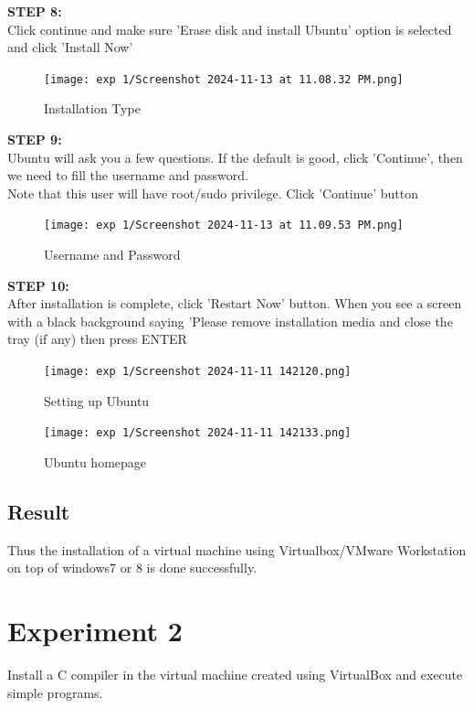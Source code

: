 \documentclass[12pt]{article}
\begin{document}
\begin{spacing}{1.5}
\begin{adjustwidth}{0cm}{0cm}
\begin{justify}
\textbf{STEP 8:} \\
Click continue and make sure 'Erase disk and install Ubuntu' option is selected and click 'Install Now'

\begin{figure}[H]
    \centering
    \texttt{[image: exp 1/Screenshot 2024-11-13 at 11.08.32 PM.png]}
    \caption{Installation Type}
    \label{fig: 1}
\end{figure}

\textbf{STEP 9:} \\
Ubuntu will ask you a few questions. If the default is good, click 'Continue', then we need to fill the username and password. \\
Note that this user will have root/sudo privilege. Click 'Continue' button

\begin{figure}[H]
    \centering
    \texttt{[image: exp 1/Screenshot 2024-11-13 at 11.09.53 PM.png]}
    \caption{Username and Password }
    \label{fig: 1}
\end{figure}

\textbf{STEP 10:} \\
After installation is complete, click 'Restart Now' button. When you see a screen with a black background saying 'Please remove installation media and close the tray (if any) then press ENTER

\begin{figure}[H]
    \centering
    \texttt{[image: exp 1/Screenshot 2024-11-11 142120.png]}
    \caption{Setting up Ubuntu}
    \label{fig: 1}
\end{figure}

\begin{figure}[H]
    \centering
    \texttt{[image: exp 1/Screenshot 2024-11-11 142133.png]}
    \caption{Ubuntu homepage}
    \label{fig: 1}
\end{figure}

\subsection{Result}
Thus the installation of a virtual machine using Virtualbox/VMware Workstation on top of windows7 or 8 is done successfully.

\newpage


\section{Experiment 2}
Install a C compiler in the virtual machine created using VirtualBox and execute simple programs.


\end{justify}
\end{adjustwidth}
\end{spacing}
\end{document}
